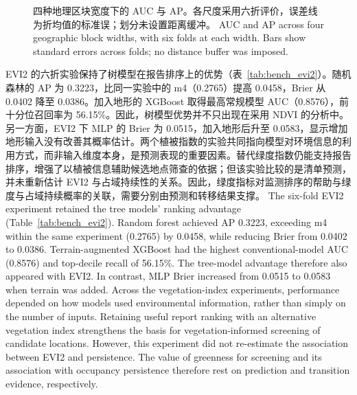 \fi
\begin{figure}[htbp]\centering{}
\caption{\ifzh
四种地理区块宽度下的 AUC 与 AP。各尺度采用六折评价，误差线为折均值的标准误；划分未设置距离缓冲。
\else
AUC and AP across four geographic block widths, with six folds at each width. Bars show standard errors across folds; no distance buffer was imposed.
\fi}\label{fig:blocksize}
\end{figure}
\ifzh
EVI2 的六折实验保持了树模型在报告排序上的优势（表~\ref{tab:bench_evi2}）。随机森林的 AP 为 0.3223，比同一实验中的 m4（0.2765）提高 0.0458，Brier 从 0.0402 降至 0.0386。加入地形的 XGBoost 取得最高常规模型 AUC（0.8576），前十分位召回率为 56.15\%。因此，树模型优势并不只出现在采用 NDVI 的分析中。另一方面，EVI2 下 MLP 的 Brier 为 0.0515，加入地形后升至 0.0583，显示增加地形输入没有改善其概率估计。两个植被指数的实验共同指向模型对环境信息的利用方式，而非输入维度本身，是预测表现的重要因素。替代绿度指数仍能支持报告排序，增强了以植被信息辅助候选地点筛查的依据；但该实验比较的是清单预测，并未重新估计 EVI2 与占域持续性的关系。因此，绿度指标对监测排序的帮助与绿度与占域持续概率的关联，需要分别由预测和转移结果支撑。
\else
The six-fold EVI2 experiment retained the tree models' ranking advantage (Table~\ref{tab:bench_evi2}). Random forest achieved AP 0.3223, exceeding m4 within the same experiment (0.2765) by 0.0458, while reducing Brier from 0.0402 to 0.0386. Terrain-augmented XGBoost had the highest conventional-model AUC (0.8576) and top-decile recall of 56.15\%. The tree-model advantage therefore also appeared with EVI2. In contrast, MLP Brier increased from 0.0515 to 0.0583 when terrain was added. Across the vegetation-index experiments, performance depended on how models used environmental information, rather than simply on the number of inputs. Retaining useful report ranking with an alternative vegetation index strengthens the basis for vegetation-informed screening of candidate locations. However, this experiment did not re-estimate the association between EVI2 and persistence. The value of greenness for screening and its association with occupancy persistence therefore rest on prediction and transition evidence, respectively.
\fi
{}
\FloatBarrier
